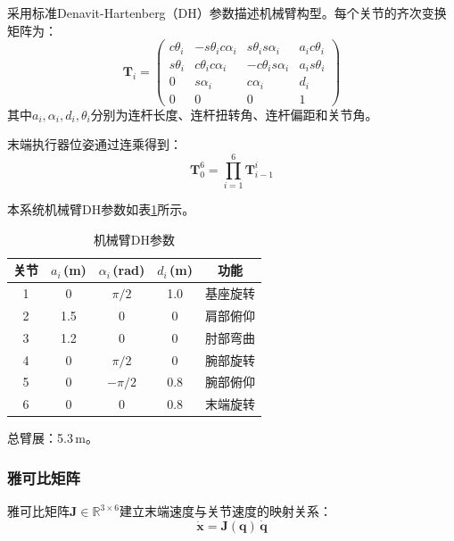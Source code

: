 \documentclass[12pt,a4paper]{ctexart}
\begin{document}
采用标准Denavit-Hartenberg（DH）参数描述机械臂构型\cite{siciliano2016}。每个关节的齐次变换矩阵为：
\begin{equation}
  \mathbf{T}_i = \begin{pmatrix} c\theta_i & -s\theta_i c\alpha_i & s\theta_i s\alpha_i & a_i c\theta_i \\ s\theta_i & c\theta_i c\alpha_i & -c\theta_i s\alpha_i & a_i s\theta_i \\ 0 & s\alpha_i & c\alpha_i & d_i \\ 0 & 0 & 0 & 1 \end{pmatrix}
\end{equation}
其中$a_i, \alpha_i, d_i, \theta_i$分别为连杆长度、连杆扭转角、连杆偏距和关节角。

末端执行器位姿通过连乘得到：
\begin{equation}
  \mathbf{T}_{0}^{6} = \prod_{i=1}^{6} \mathbf{T}_{i-1}^{i}
\end{equation}

本系统机械臂DH参数如表\ref{tab:dh}所示。

\begin{table}[H]
\centering
\caption{机械臂DH参数}
\label{tab:dh}
\begin{tabular}{ccccc}
\toprule
关节 & $a_i$\,(m) & $\alpha_i$\,(rad) & $d_i$\,(m) & 功能 \\
\midrule
1 & 0     & $\pi/2$  & 1.0 & 基座旋转 \\
2 & 1.5   & 0        & 0   & 肩部俯仰 \\
3 & 1.2   & 0        & 0   & 肘部弯曲 \\
4 & 0     & $\pi/2$  & 0   & 腕部旋转 \\
5 & 0     & $-\pi/2$ & 0.8 & 腕部俯仰 \\
6 & 0     & 0        & 0.8 & 末端旋转 \\
\bottomrule
\end{tabular}
\end{table}

总臂展：5.3\,m。

\subsubsection{雅可比矩阵}

雅可比矩阵$\mathbf{J} \in \mathbb{R}^{3 \times 6}$建立末端速度与关节速度的映射关系：
\begin{equation}
  \dot{\mathbf{x}} = \mathbf{J}(\mathbf{q})\,\dot{\mathbf{q}}
\end{equation}
\end{document}
